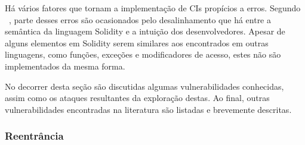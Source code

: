 Há vários fatores que tornam a implementação de CIs propícios a erros. Segundo ~, parte desses erros são ocasionados pelo desalinhamento que há entre a semântica da linguagem Solidity e a intuição dos desenvolvedores. Apesar de alguns elementos em Solidity serem similares aos encontrados em outras linguagens, como funções, exceções e modificadores de acesso, estes não são implementados da mesma forma.

No decorrer desta seção são discutidas algumas vulnerabilidades conhecidas, assim como os ataques resultantes da exploração destas. Ao final, outras vulnerabilidades encontradas na literatura são listadas e brevemente descritas.




\subsubsection*{\textbf{Reentrância}}

